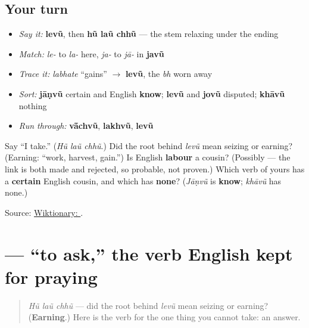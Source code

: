 \subsection*{Your turn}
\begin{itemize}
\raggedright
  \item \emph{Say it:} \textbf{levũ}, then \textbf{hũ laũ chhũ} — the stem relaxing under the ending
  \item \emph{Match:} \emph{le-} to \emph{la-} here, \emph{ja-} to \emph{jā-} in \textbf{javũ}
  \item \emph{Trace it:} \emph{labhate} \textquotedblleft{}gains\textquotedblright{} $\to$ \textbf{levũ}, the \emph{bh} worn away
  \item \emph{Sort:} \textbf{jāṇvũ} certain and English \textbf{know}; \textbf{levũ} and \textbf{jovũ} disputed; \textbf{khāvũ} nothing
  \item \emph{Run through:} \textbf{vā̃chvũ}, \textbf{lakhvũ}, \textbf{levũ}
\end{itemize}

\begin{tcolorbox}[breakable,colback=teal!4,colframe=teal!35!black,title={Before you move on}]
Say \textquotedblleft{}I take.\textquotedblright{} (\emph{Hũ laũ chhũ}.) Did the root behind \emph{levũ} mean seizing or earning? (Earning: \textquotedblleft{}work, harvest, gain.\textquotedblright{}) Is English \textbf{labour} a cousin? (Possibly — the link is both made and rejected, so probable, not proven.) Which verb of yours has a \textbf{certain} English cousin, and which has \textbf{none}? (\emph{Jāṇvũ} is \textbf{know}; \emph{khāvũ} has none.)

Source: \href{https://en.wiktionary.org/wiki/\%E0\%AA\%B2\%E0\%AB\%87\%E0\%AA\%B5\%E0\%AB\%81\%E0\%AA\%82}{Wiktionary: }.
\end{tcolorbox}
\section[\texorpdfstring{\gu{પૂછવું} (pūchhvũ)}{પૂછવું (pūchhvũ)}]{ — \textquotedblleft{}to ask,\textquotedblright{} the verb English kept for praying}

\label{lesson:GU-C09-puchhvun}



\begin{quote}
\emph{Hũ laũ chhũ} — did the root behind \emph{levũ} mean seizing or earning? (\textbf{Earning}.) Here is the verb for the one thing you cannot take: an answer.
\end{quote}

